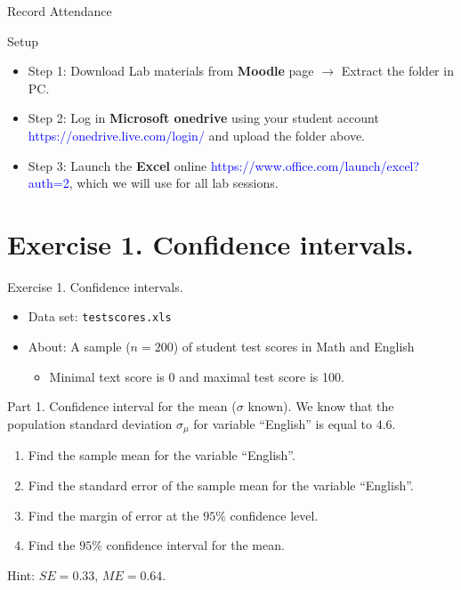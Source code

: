 \documentclass[
  10pt,
  ignorenonframetext,
]{beamer}
\providecommand{\tightlist}{%
  \setlength{\itemsep}{0pt}\setlength{\parskip}{0pt}}
\begin{document}
\begin{frame}{Record Attendance}
\protect\hypertarget{record-attendance}{}
\end{frame}

\begin{frame}{Setup}
\protect\hypertarget{setup}{}
\begin{itemize}
\item
  Step 1: Download Lab materials from \textbf{Moodle} page
  \(\rightarrow\) Extract the folder in PC.
\item
  Step 2: Log in \textbf{Microsoft onedrive} using your student account
  \textcolor{blue}{https://onedrive.live.com/login/} and upload the
  folder above.
\item
  Step 3: Launch the \textbf{Excel} online
  \textcolor{blue}{https://www.office.com/launch/excel?auth=2}, which we
  will use for all lab sessions.
\end{itemize}
\end{frame}

\hypertarget{exercise-1.-confidence-intervals.}{%
\section{Exercise 1. Confidence
intervals.}\label{exercise-1.-confidence-intervals.}}

\begin{frame}{Exercise 1. Confidence intervals.}
\begin{itemize}
\tightlist
\item
  Data set: \texttt{testscores.xls}
\item
  About: A sample (\(n=200\)) of student test scores in Math and English

  \begin{itemize}
  \tightlist
  \item
    Minimal text score is 0 and maximal test score is 100.
  \end{itemize}
\end{itemize}
\end{frame}

\begin{frame}{Part 1. Confidence interval for the mean (\(\sigma\)
known).}
\protect\hypertarget{part-1.-confidence-interval-for-the-mean-sigma-known.}{}
We know that the population standard deviation \(\sigma_\mu\) for
variable ``English'' is equal to \(4.6\).

\begin{enumerate}
\item
  Find the sample mean for the variable ``English''.
\item
  Find the standard error of the sample mean for the variable
  ``English''.
\item
  Find the margin of error at the \(95\%\) confidence level.
\item
  Find the \(95\%\) confidence interval for the mean.
\end{enumerate}

Hint: \(SE=0.33\), \(ME=0.64\).
\end{frame}
\end{document}
